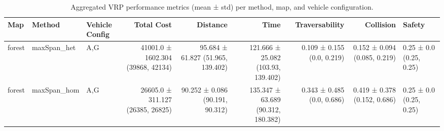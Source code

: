 \begin{table}
\caption{Aggregated VRP performance metrics (mean ± std) per method, map, and vehicle configuration.}
\label{tab:vrp_results}
\begin{tabular}{lllrrrrr}
\toprule
Map & Method & Vehicle Config & Total Cost & Distance & Time & Traversability & Collision & Safety \\
\midrule
forest & maxSpan_het & A,G & 41001.0 ± 1602.304 (39868, 42134) & 95.684 ± 61.827 (51.965, 139.402) & 121.666 ± 25.082 (103.93, 139.402) & 0.109 ± 0.155 (0.0, 0.219) & 0.152 ± 0.094 (0.085, 0.219) & 0.25 ± 0.0 (0.25, 0.25) \\
forest & maxSpan_hom & A,G & 26605.0 ± 311.127 (26385, 26825) & 90.252 ± 0.086 (90.191, 90.312) & 135.347 ± 63.689 (90.312, 180.382) & 0.343 ± 0.485 (0.0, 0.686) & 0.419 ± 0.378 (0.152, 0.686) & 0.25 ± 0.0 (0.25, 0.25) \\
\bottomrule
\end{tabular}
\end{table}

